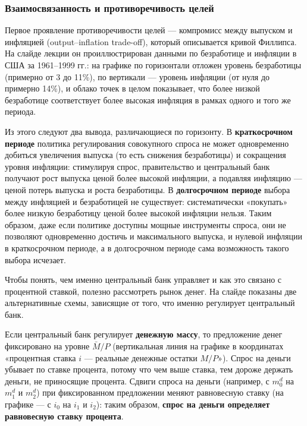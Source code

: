 \documentclass[11pt,a4paper]{article}
\begin{document}
\subsubsection{Взаимосвязанность и противоречивость целей}


Первое проявление противоречивости целей --- компромисс между выпуском и инфляцией (output--inflation trade-off), который описывается кривой Филлипса. На слайде лекции он проиллюстрирован данными по безработице и инфляции в США за 1961--1999 гг.: на графике по горизонтали отложен уровень безработицы (примерно от 3 до 11\%), по вертикали --- уровень инфляции (от нуля до примерно 14\%), и облако точек в целом показывает, что более низкой безработице соответствует более высокая инфляция в рамках одного и того же периода.

Из этого следуют два вывода, различающиеся по горизонту. В \textbf{краткосрочном периоде} политика регулирования совокупного спроса не может одновременно добиться увеличения выпуска (то есть снижения безработицы) и сокращения уровня инфляции: стимулируя спрос, правительство и центральный банк получают рост выпуска ценой более высокой инфляции, а подавляя инфляцию --- ценой потерь выпуска и роста безработицы. В \textbf{долгосрочном периоде} выбора между инфляцией и безработицей не существует: систематически «покупать» более низкую безработицу ценой более высокой инфляции нельзя. Таким образом, даже если политике доступны мощные инструменты спроса, они не позволяют одновременно достичь и максимального выпуска, и нулевой инфляции в краткосрочном периоде, а в долгосрочном периоде сама возможность такого выбора исчезает.


Чтобы понять, чем именно центральный банк управляет и как это связано с процентной ставкой, полезно рассмотреть рынок денег. На слайде показаны две альтернативные схемы, зависящие от того, что именно регулирует центральный банк.

Если центральный банк регулирует \textbf{денежную массу}, то предложение денег фиксировано на уровне $\bar M/P$ (вертикальная линия на графике в координатах «процентная ставка $i$ --- реальные денежные остатки $M/P$»). Спрос на деньги убывает по ставке процента, потому что чем выше ставка, тем дороже держать деньги, не приносящие процента. Сдвиги спроса на деньги (например, с $m_0^d$ на $m_1^d$ и $m_2^d$) при фиксированном предложении меняют равновесную ставку (на графике --- с $i_0$ на $i_1$ и $i_2$): таким образом, \textbf{спрос на деньги определяет равновесную ставку процента}.
\end{document}
